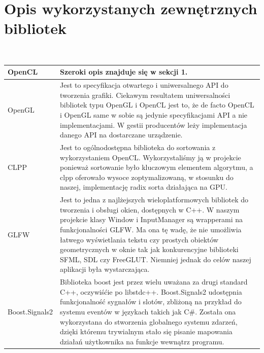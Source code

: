 \documentclass[polish, 12pt]{aghthesis}
\begin{document}
\section{Opis wykorzystanych zewnętrznych bibliotek}
	\ \\
	\begin{tabular}{| p{} | p{} |}
		\hline
			OpenCL & Szeroki opis znajduje się w sekcji 1. \\
		\hline
			OpenGL &  Jest to specyfikacja otwartego i uniwersalnego API do tworzenia grafiki. Ciekawym resultatem uniwersalności bibliotek typu OpenGL i OpenCL jest to, że de facto OpenCL i OpenGL same w sobie są jedynie specyfikacjami API a nie implementacjami. W gestii producentów leży implementacja danego API na dostarczane urządzenie.\\
		\hline
			CLPP &  Jest to ogólnodostępna biblioteka do sortowania z wykorzystaniem OpenCL. Wykorzystaliśmy ją w projekcie ponieważ sortowanie było kluczowym elementem algorytmu, a clpp oferowało wysoce zoptymalizowaną, w stosunku do naszej, implementację radix sorta działająca na GPU.\\
		\hline
			GLFW &  Jest to jedna z najlżejszych wieloplatformowych bibliotek do tworzenia i obsługi okien, dostępnych w C++. W naszym projekcie klasy Window i InputManager są wrapperami na funkcjonalności GLFW. Ma ona tę wadę, że nie umożliwia łatwego wyświetlania tekstu czy prostych obiektów geometrycznych w oknie tak jak konkurencyjne biblioteki SFML, SDL czy FreeGLUT. Niemniej jednak do celów naszej aplikacji była wystarczająca. \\
		\hline
			Boost.Signals2 &  Biblioteka boost jest przez wielu uważana za drugi standard C++, oczywiśćie po libstdc++. Boost.Signals2 udostępnia funkcjonalność sygnałów i slotów, zbliżoną na przykład do systemu eventów w językach takich jak C\#. Została ona wykorzystana do stworzenia globalnego systemu zdarzeń, dzięki któremu trywialnym stało się pisanie mapowania działań użytkownika na funkcje wewnątrz programu. \\
		\hline	
	\end{tabular}
	\clearpage
	
	\nocite{OpenCLProgrammingGuide,GameCodingComplete,CLPP,SPHWebinar}
	
	
\end{document}
